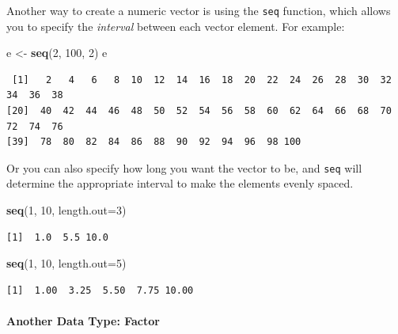 \documentclass[
]{article}
\newenvironment{Shaded}{\begin{snugshade}}{\end{snugshade}}
\newcommand{\DataTypeTok}[1]{\textcolor[rgb]{0.13,0.29,0.53}{#1}}
\newcommand{\DecValTok}[1]{\textcolor[rgb]{0.00,0.00,0.81}{#1}}
\newcommand{\KeywordTok}[1]{\textcolor[rgb]{0.13,0.29,0.53}{\textbf{#1}}}
\newcommand{\NormalTok}[1]{#1}
\newcommand{\StringTok}[1]{\textcolor[rgb]{0.31,0.60,0.02}{#1}}
\begin{document}
Another way to create a numeric vector is using the \texttt{seq} function, which allows you to specify the \emph{interval} between each vector element.
For example:

\begin{Shaded}
\begin{Highlighting}[]
\NormalTok{e <-}\StringTok{ }\KeywordTok{seq}\NormalTok{(}\DecValTok{2}\NormalTok{, }\DecValTok{100}\NormalTok{, }\DecValTok{2}\NormalTok{)}
\NormalTok{e}
\end{Highlighting}
\end{Shaded}

\begin{verbatim}
 [1]   2   4   6   8  10  12  14  16  18  20  22  24  26  28  30  32  34  36  38
[20]  40  42  44  46  48  50  52  54  56  58  60  62  64  66  68  70  72  74  76
[39]  78  80  82  84  86  88  90  92  94  96  98 100
\end{verbatim}

Or you can also specify how long you want the vector to be, and \texttt{seq} will determine the appropriate interval to make the elements evenly spaced.

\begin{Shaded}
\begin{Highlighting}[]
\KeywordTok{seq}\NormalTok{(}\DecValTok{1}\NormalTok{, }\DecValTok{10}\NormalTok{, }\DataTypeTok{length.out=}\DecValTok{3}\NormalTok{)}
\end{Highlighting}
\end{Shaded}

\begin{verbatim}
[1]  1.0  5.5 10.0
\end{verbatim}

\begin{Shaded}
\begin{Highlighting}[]
\KeywordTok{seq}\NormalTok{(}\DecValTok{1}\NormalTok{, }\DecValTok{10}\NormalTok{, }\DataTypeTok{length.out=}\DecValTok{5}\NormalTok{)}
\end{Highlighting}
\end{Shaded}

\begin{verbatim}
[1]  1.00  3.25  5.50  7.75 10.00
\end{verbatim}

\hypertarget{another-data-type-factor}{%
\paragraph{Another Data Type: Factor}\label{another-data-type-factor}}
\end{document}
